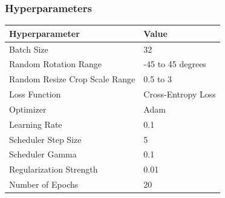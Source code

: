 \documentclass{beamer}
\begin{document}
\begin{frame}
\frametitle{Hyperparameters}
\begin{table}[]
\begin{tabular}{ll}
\hline
\textbf{Hyperparameter}        & \textbf{Value}     \\ \hline
Batch Size                     & 32                 \\
Random Rotation Range          & -45 to 45 degrees  \\
Random Resize Crop Scale Range & 0.5 to 3           \\
Loss Function                  & Cross-Entropy Loss \\
Optimizer                      & Adam               \\
Learning Rate                  & 0.1                \\
Scheduler Step Size            & 5                  \\
Scheduler Gamma                & 0.1                \\
Regularization Strength        & 0.01               \\
Number of Epochs               & 20                 \\ \hline
\end{tabular}
\end{table}
\end{frame}

\end{document}
